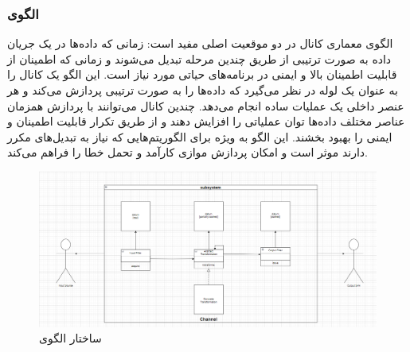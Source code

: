\subsubsection{الگوی }
\label{archChannelSec}
\begin{RTL}
الگوی معماری کانال \cite{ref4} در دو موقعیت اصلی مفید است:
زمانی که داده‌ها در یک جریان داده به صورت ترتیبی از طریق
چندین مرحله تبدیل می‌شوند و زمانی که اطمینان از قابلیت اطمینان
بالا و ایمنی در برنامه‌های حیاتی مورد نیاز است.
این الگو یک کانال را به عنوان یک لوله در نظر می‌گیرد که
داده‌ها را به صورت ترتیبی پردازش می‌کند و هر عنصر داخلی
یک عملیات ساده انجام می‌دهد. چندین کانال می‌توانند با پردازش همزمان
عناصر مختلف داده‌ها توان عملیاتی را افزایش دهند و از طریق تکرار
قابلیت اطمینان و ایمنی را بهبود بخشند. این الگو به ویژه برای الگوریتم‌هایی
که نیاز به تبدیل‌های مکرر دارند موثر است و امکان پردازش
موازی کارآمد و تحمل خطا را فراهم می‌کند.
\end{RTL}
\begin{figure}[h!]
\centering
\includegraphics[scale=0.5]{images/first/channel.png}
\caption{ساختار الگوی }
\end{figure}